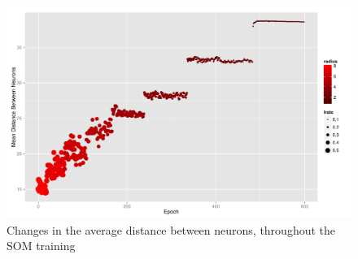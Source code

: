 \begin{figure}[h]
  \centerline{\includegraphics[scale=0.6]{./plots/som/average_distance.pdf}}
  \label{fig:avg_dist}
  \caption{Changes in the average distance between neurons, throughout the SOM training}
\end{figure}

